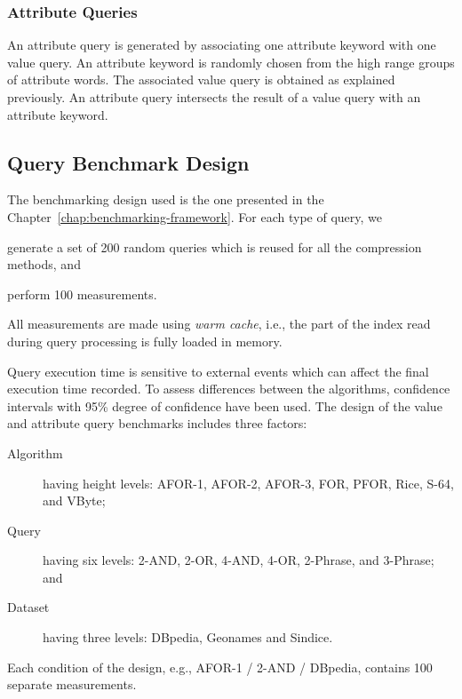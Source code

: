 \subsubsection{Attribute Queries}

An attribute query is generated by associating one attribute keyword with one
value query. An attribute keyword is randomly chosen from the high range
groups of attribute words. The associated value query is obtained as explained
previously. An attribute query intersects the result of a value query with an
attribute keyword.

\subsection{Query Benchmark Design}

The benchmarking design used is the one presented in the
Chapter~\ref{chap:benchmarking-framework}. For each type of query, we 
\begin{inparaenum}[(1)]
\item generate a set of 200 random queries which is reused for all the
compression methods, and
\item perform 100 measurements.
\end{inparaenum}
All measurements are made using \emph{warm cache}, i.e., the part of the index
read during query processing is fully loaded in memory.

Query execution time is sensitive to external events which can affect the
final execution time recorded.
To assess differences between the algorithms, confidence intervals with 95\%
degree of confidence have been used.  The design of the value and attribute
query benchmarks includes three factors:
\begin{description}
\item[Algorithm] having height levels: AFOR-1, AFOR-2, AFOR-3, FOR, PFOR,
Rice, S-64, and VByte;
\item[Query] having six levels: 2-AND, 2-OR, 4-AND, 4-OR, 2-Phrase, and
3-Phrase; and
\item[Dataset] having three levels: DBpedia, Geonames and Sindice. 
\end{description}
Each condition of the design, e.g., AFOR-1 / 2-AND / DBpedia, contains 100
separate measurements.

